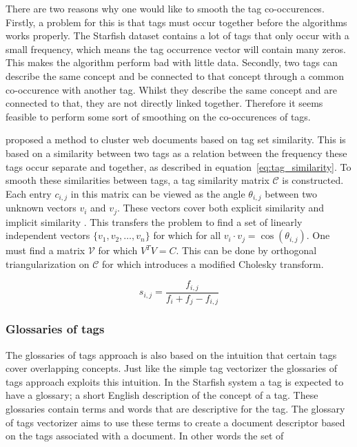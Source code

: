 There are two reasons why one would like to smooth the tag co-occurences.
Firstly, a problem for this is that tags must occur together before the
algorithms works properly. The Starfish dataset contains a lot of tags that
only occur with a small frequency, which means the tag occurrence vector will
contain many zeros. This makes the algorithm perform bad with little data.
Secondly, two tags can describe the same concept and be connected to that
concept through a common co-occurence with another tag. Whilst they describe
the same concept and are connected to that, they are not directly linked
together. Therefore it seems feasible to perform some sort of smoothing on the
co-occurences of tags.

\citet{zhou2011web} proposed a method to cluster web documents based on tag set
similarity. This is based on a similarity between two tags as a relation
between the frequency these tags occur separate and together, as described in
equation~\ref{eq:tag_similarity}. To smooth these similarities between tags, a
tag similarity matrix $\mathcal{C}$ is constructed. Each entry $c_{i,j}$ in
this matrix can be viewed as the angle $\theta_{i,j}$ between two unknown
vectors $v_i$ and $v_j$. These vectors cover both explicit similarity and
implicit similarity \citep{park2010vector}. This transfers the problem to find
a set of linearly independent vectors $\{v_1,v_2,\ldots,v_n\}$ for which for
all $v_i \cdot v_j = \cos(\theta_{i,j})$. One must find a matrix $\mathcal{V}$
for which $V^TV = C$. This can be done by orthogonal triangularization on
$\mathcal{C}$ for which \citeauthor{zhou2011web} introduces a modified Cholesky
transform.

\begin{equation} \label{eq:tag_similarity}
s_{i,j} = \frac{f_{i,j}}{f_i + f_j - f_{i,j}}
\end{equation}


\subsubsection{Glossaries of tags}
The glossaries of tags approach is also based on the intuition that certain
tags cover overlapping concepts. Just like the simple tag vectorizer the
glossaries of tags approach exploits this intuition. In the Starfish system a
tag is expected to have a glossary; a short English description of the concept
of a tag. These glossaries contain terms and words that are descriptive for the
tag. The glossary of tags vectorizer aims to use these terms to create a
document descriptor based on the tags associated with a document. In other
words the set of

